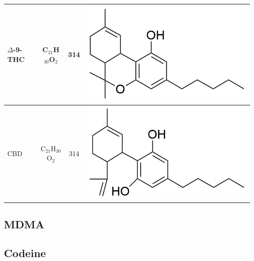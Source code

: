 \begin{table}
\begin{tabular}{lccc}
$\Delta$-9-THC & C$_{21}$H$_{30}$O$_2$ & 314 &  
\begin{minipage}[c]{0.3\linewidth}\centering
\includegraphics[height=0.1\textheight]{pics/other_drugs/THC_struct.png}\end{minipage}\\ \midrule
CBD & C$_{21}$H$_{30}$O$_2$ & 314 &  
\begin{minipage}[c]{0.3\linewidth}\centering
\includegraphics[height=0.1\textheight]{pics/other_drugs/CBD_struct.png}\end{minipage}\\ 
\bottomrule
\end{tabular}
\label{tab:DRs_structs}
\end{table}



\subsection{MDMA}


\subsection{Codeine}


